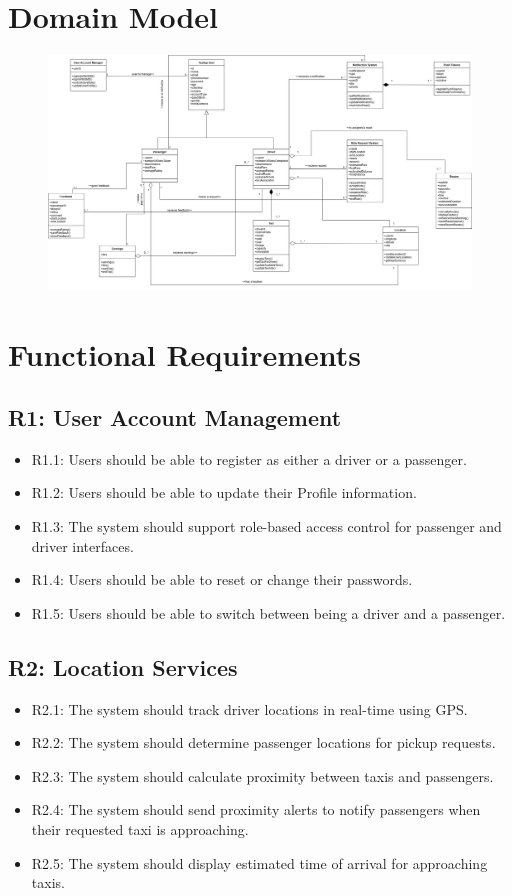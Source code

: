 \documentclass[a4paper,12pt]{article}
\begin{document}
\section{Domain Model}

\begin{figure}[H]
  \centering
  \includegraphics[width=1\textwidth]{Updated_Domain_Model.drawio.png} 
\end{figure}

\section{Functional Requirements}

\subsection*{R1: User Account Management}
\begin{itemize}
    \item R1.1: Users should be able to register as either a driver or a passenger.
    \item R1.2: Users should be able to update their Profile information.
    \item R1.3: The system should support role-based access control for passenger and driver interfaces.
    \item R1.4: Users should be able to reset or change their passwords.
    \item R1.5: Users should be able to switch between being a driver and a passenger.
\end{itemize}

\subsection*{R2: Location Services}
\begin{itemize}
    \item R2.1: The system should track driver locations in real-time using GPS.
    \item R2.2: The system should determine passenger locations for pickup requests.
    \item R2.3: The system should calculate proximity between taxis and passengers.
    \item R2.4: The system should send proximity alerts to notify passengers when their requested taxi is approaching.
    \item R2.5: The system should display estimated time of arrival for approaching taxis.
\end{itemize}
\end{document}
